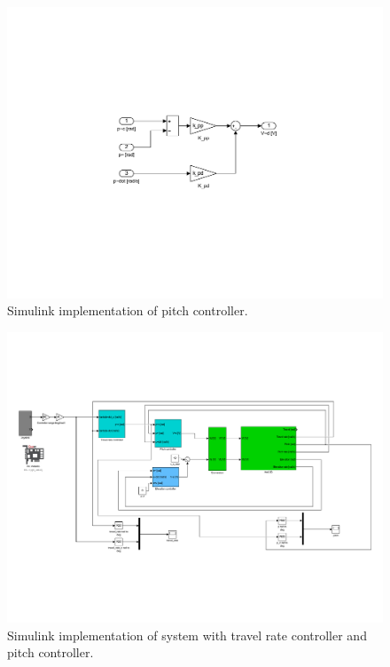 \begin{figure}[!htb]
	\centering
	\includegraphics[trim=200 200 200 200,clip,width=\textwidth]{simulink/P2p1_pitch_reg.pdf}
	\caption{Simulink implementation of pitch controller.}
\label{fig:pitch_controller}
\end{figure}

\begin{figure}[!htb]
	\centering
	\includegraphics[trim=0 100 0 100, clip, width=\textwidth]{simulink/P2p2.pdf}
	\caption{Simulink implementation of system with travel rate controller and pitch controller.}
\label{fig:monoTravelPitch}
\end{figure}

